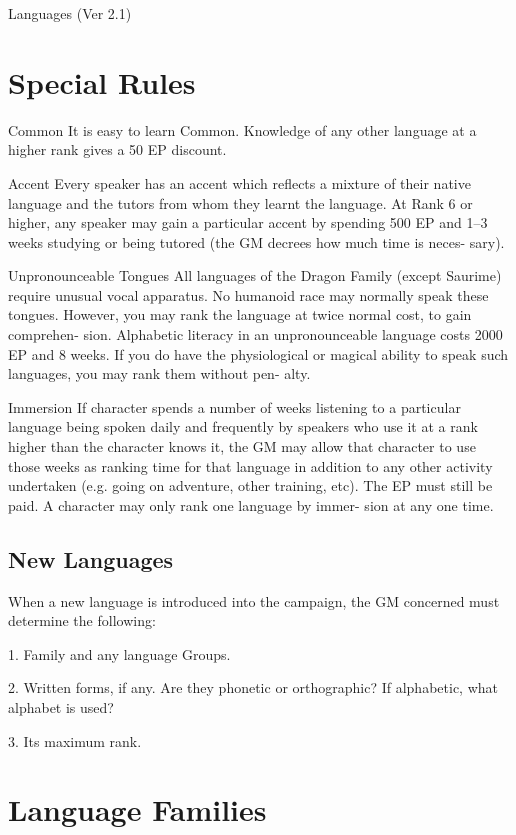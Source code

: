 \begin{Chapter}{Languages (Ver 2.1)}
\section{Special Rules}

Common  It is easy to learn Common. Knowledge 
of any other language at a higher rank gives a 50%
EP discount. 

Accent Every speaker has an accent which reflects 
a  mixture  of  their  native  language  and  the  tutors 
from whom they learnt the language. At Rank 6 or 
higher, any speaker may gain a particular accent by 
spending 500 EP and 1–3 weeks studying or being 
tutored  (the  GM  decrees  how  much  time  is neces-
sary). 

Unpronounceable  Tongues  All  languages  of  the 
Dragon  Family  (except  Saurime)  require  unusual 
vocal  apparatus.  No  humanoid  race  may  normally 
speak  these  tongues.  However,  you  may  rank  the 
language at twice normal cost, to gain comprehen-
sion.  Alphabetic  literacy  in  an  unpronounceable 
language  costs  2000  EP  and  8  weeks.  If  you  do 
have  the  physiological  or  magical  ability  to  speak 
such  languages,  you  may  rank  them  without  pen-
alty. 

Immersion If character spends a number of weeks 
listening  to  a  particular  language  being  spoken 
daily  and  frequently  by  speakers  who  use  it  at  a 
rank  higher  than  the  character  knows  it,  the  GM 
may  allow  that  character  to  use  those  weeks  as 
ranking  time  for  that  language  in  addition  to  any 
other activity undertaken (e.g. going on adventure, 
other  training,  etc).  The  EP  must  still  be  paid.  A 
character  may  only  rank  one  language  by  immer-
sion at any one time. 

\subsection{New Languages}

When a new language is introduced into the campaign, the GM concerned
must determine the following:

1. Family and any language Groups. 

2.  Written  forms,  if  any.  Are  they  phonetic  or 
orthographic? If alphabetic, what alphabet is used? 

3. Its maximum rank. 

\section{Language Families}


\end{Chapter}
